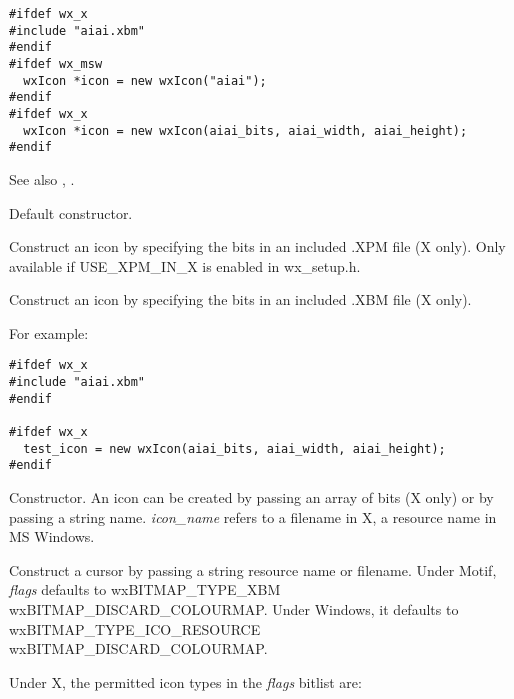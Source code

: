 \begin{verbatim}
#ifdef wx_x
#include "aiai.xbm"
#endif
#ifdef wx_msw
  wxIcon *icon = new wxIcon("aiai");
#endif
#ifdef wx_x
  wxIcon *icon = new wxIcon(aiai_bits, aiai_width, aiai_height);
#endif
\end{verbatim}

See also , .



Default constructor.


Construct an icon by specifying the bits in an included .XPM file (X only). 
Only available if USE\_XPM\_IN\_X is enabled in wx\_setup.h.


Construct an icon by specifying the bits in an included .XBM file (X only). 

For example:

\begin{verbatim}
#ifdef wx_x
#include "aiai.xbm"
#endif

#ifdef wx_x
  test_icon = new wxIcon(aiai_bits, aiai_width, aiai_height);
#endif
\end{verbatim}


Constructor. An icon can be created by passing an array of bits (X only)
or by passing a string name. {\it icon\_name} refers to a filename in X,
a resource name in MS Windows.  

Construct a cursor by passing a string resource name or filename.
Under Motif, {\it flags} defaults to wxBITMAP\_TYPE\_XBM \pipe wxBITMAP\_DISCARD\_COLOURMAP. Under Windows,
it defaults to wxBITMAP\_TYPE\_ICO\_RESOURCE \pipe wxBITMAP\_DISCARD\_COLOURMAP.

Under X, the permitted icon types in the {\it flags} bitlist are:

\begin{twocollist}\itemsep=0pt
\end{twocollist}

